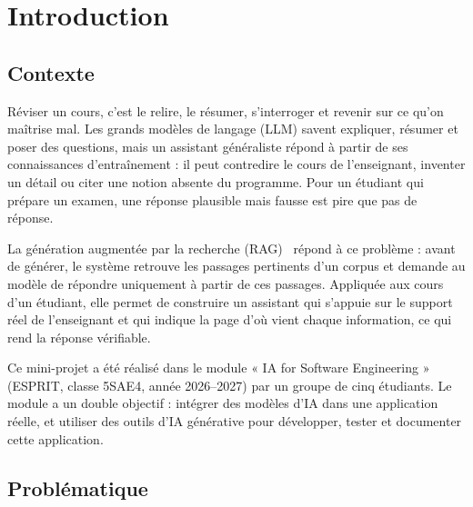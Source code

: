 \documentclass[12pt,a4paper]{report}
\begin{document}
\cleardoublepage
{}
\setcounter{page}{1}

\chapter{Introduction}
\label{chap:intro}

\section{Contexte}

Réviser un cours, c'est le relire, le résumer, s'interroger et revenir sur ce qu'on maîtrise mal. Les
grands modèles de langage (LLM) savent expliquer, résumer et poser des questions, mais un assistant
généraliste répond à partir de ses connaissances d'entraînement : il peut contredire le cours de
l'enseignant, inventer un détail ou citer une notion absente du programme. Pour un étudiant qui prépare un
examen, une réponse plausible mais fausse est pire que pas de réponse.

La génération augmentée par la recherche (RAG)~\cite{lewis2020rag} répond à ce problème : avant de
générer, le système retrouve les passages pertinents d'un corpus et demande au modèle de répondre
uniquement à partir de ces passages. Appliquée aux cours d'un étudiant, elle permet de construire un
assistant qui s'appuie sur le support réel de l'enseignant et qui indique la page d'où vient chaque
information, ce qui rend la réponse vérifiable.

Ce mini-projet a été réalisé dans le module « IA for Software Engineering » (ESPRIT, classe 5SAE4,
année 2026--2027) par un groupe de cinq étudiants. Le module a un double objectif : intégrer des modèles
d'IA dans une application réelle, et utiliser des outils d'IA générative pour développer, tester et
documenter cette application.

\section{Problématique}
\end{document}
